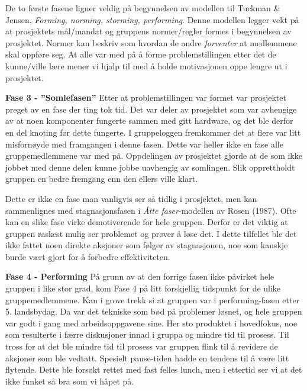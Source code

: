 De to første fasene ligner veldig på begynnelsen av modellen til Tuckman \& Jensen, \textit{Forming, norming, storming, performing}.
Denne modellen legger vekt på at prosjektets mål/mandat og gruppens normer/regler formes i begynnelsen av prosjektet.
Normer kan beskriv som hvordan de andre \textit{forventer} at medlemmene skal oppføre seg\citep{schwarz}.
At alle var med på å forme problemstillingen etter det de kunne/ville lære mener vi hjalp til med å holde motivasjonen oppe lengre ut i prosjektet.
\vspace{\secspace}

\noindent \textbf{\Large Fase 3 - ''Somlefasen''}
Etter at problemstillingen var formet var prosjektet preget av en fase der ting tok tid.
Det var deler av prosjektet som var avhengige av at noen komponenter fungerte sammen med gitt hardware, og det ble derfor en del knoting før dette fungerte.
I gruppeloggen fremkommer det at flere var litt misfornøyde med framgangen i denne fasen.
Dette var heller ikke en fase alle gruppemedlemmene var med på.
Oppdelingen av prosjektet gjorde at de som ikke jobbet med denne delen kunne jobbe uavhengig av somlingen.
Slik opprettholdt gruppen en bedre fremgang enn den ellers ville klart.

Dette er ikke en fase man vanligvis ser så tidlig i prosjektet, men kan sammenlignes med stagnasjonsfasen i \textit{Åtte faser}-modellen av Rosen (1987).
Ofte kan en slike fase virke demotiverende for hele gruppen.
Derfor er det viktig at gruppen raskest mulig ser problemet og prøver å løse det.
I dette tilfellet ble det ikke fattet noen direkte aksjoner som følger av stagnasjonen, noe som kanskje burde vært gjort for å forbedre effektiviteten.
\vspace{\secspace}



\noindent \textbf{\Large Fase 4 - Performing}
På grunn av at den forrige fasen ikke påvirket hele gruppen i like stor grad, kom Fase 4 på litt forskjellig tidspunkt for de ulike gruppemedlemmene.
Kan i grove trekk si at gruppen var i performing-fasen etter 5. landsbydag.
Da var det tekniske som bød på problemer løsnet, og hele gruppen var godt i gang med arbeidsoppgavene sine.
Her sto produktet i hovedfokus, noe som resulterte i færre diskusjoner innad i gruppa og mindre tid til prosess.
Til tross for at det ble mindre tid til prosess var gruppen flink til å revidere de aksjoner som ble vedtatt.
Spesielt pause-tiden hadde en tendens til å være litt flytende.
Dette ble forsøkt rettet med fast felles lunch, men i ettertid ser vi at det ikke funket så bra som vi håpet på.

